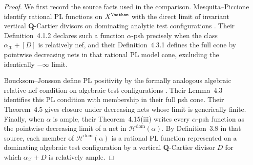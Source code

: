 \begin{proof}
We first record the source facts used in the comparison.  Mesquita--Piccione
identify rational PL functions on $X^{\bethan}$ with the direct limit of
invariant vertical $\mathbf Q$-Cartier divisors on dominating analytic
test configurations
\cite[Proposition~2.4.3 and Theorem~2.6.4]{MP24}.  Their
Definition~4.1.2 declares such a function $\alpha$-psh precisely when
the class $\alpha_{\mathcal X}+[D]$ is relatively nef, and their
Definition~4.3.1 defines the full cone by pointwise decreasing nets in
that rational PL model cone, excluding the identically $-\infty$ limit.

Boucksom--Jonsson define PL positivity by the formally analogous algebraic
relative-nef condition on algebraic test configurations
\cite[Definition~3.2]{BJ22}.  Their Lemma~4.3 identifies this PL condition
with membership in their full psh cone.  Their Theorem~4.5 gives closure
under decreasing nets whose limit is generically finite.  Finally, when
$\alpha$ is ample, their Theorem~4.15(iii) writes every
$\alpha$-psh function as the pointwise decreasing limit of a net in
$\mathcal H^{\mathrm{dom}}(\alpha)$.  By Definition~3.8 in that source,
each member of $\mathcal H^{\mathrm{dom}}(\alpha)$ is a rational PL
function represented on a dominating algebraic test configuration by a
vertical $\mathbf Q$-Cartier divisor $D$ for which
$\alpha_{\mathcal X}+D$ is relatively ample.


\end{proof}
